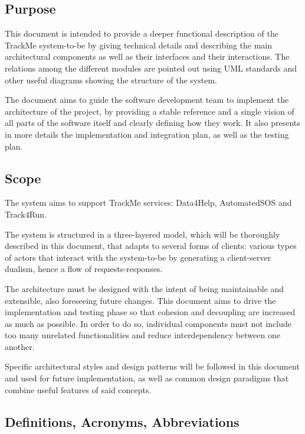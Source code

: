 
%

\subsection{Purpose}
This document is intended to provide a deeper functional description of the TrackMe system-to-be by giving technical details and describing the main architectural components as well as their interfaces and their interactions. The relations among the different modules are pointed out using UML standards and other useful diagrams showing the structure of the system.\newline

The document aims to guide the software development team to implement the architecture of the project, by providing a stable reference and a single vision of all parts of the software itself and clearly defining how they work. It also presents in more details the implementation and integration plan, as well as the testing plan.

\subsection{Scope}
The system aims to support TrackMe services: Data4Help, AutomatedSOS and Track4Run.

The system is structured in a three-layered model, which will be thoroughly described in this document, that adapts to several forms of clients: various types of actors that interact with the system-to-be by generating a client-server dualism, hence a flow of requests-responses.

The architecture must be designed with the intent of being maintainable and extensible, also foreseeing future changes. This document aims to drive the implementation and testing phase so that cohesion and decoupling are increased as much as possible. In order to do so, individual components must not include too many unrelated functionalities and reduce interdependency between one another.

Specific architectural styles and design patterns will be followed in this document and used for future implementation, as well as common design paradigms that combine useful features of said concepts.

\subsection{Definitions, Acronyms, Abbreviations}
